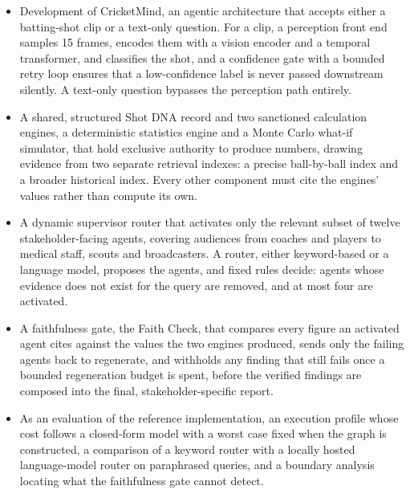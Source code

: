 \begin{itemize}
    \item Development of CricketMind, an agentic architecture that accepts either a batting-shot clip or a text-only question. For a clip, a perception front end samples 15 frames, encodes them with a vision encoder and a temporal transformer, and classifies the shot, and a confidence gate with a bounded retry loop ensures that a low-confidence label is never passed downstream silently. A text-only question bypasses the perception path entirely.
    \item A shared, structured Shot DNA record and two sanctioned calculation engines, a deterministic statistics engine and a Monte Carlo what-if simulator, that hold exclusive authority to produce numbers, drawing evidence from two separate retrieval indexes: a precise ball-by-ball index and a broader historical index. Every other component must cite the engines' values rather than compute its own.
    \item A dynamic supervisor router that activates only the relevant subset of twelve stakeholder-facing agents, covering audiences from coaches and players to medical staff, scouts and broadcasters. A router, either keyword-based or a language model, proposes the agents, and fixed rules decide: agents whose evidence does not exist for the query are removed, and at most four are activated.
    \item A faithfulness gate, the Faith Check, that compares every figure an activated agent cites against the values the two engines produced, sends only the failing agents back to regenerate, and withholds any finding that still fails once a bounded regeneration budget is spent, before the verified findings are composed into the final, stakeholder-specific report.
    \item As an evaluation of the reference implementation, an execution profile whose cost follows a closed-form model with a worst case fixed when the graph is constructed, a comparison of a keyword router with a locally hosted language-model router on paraphrased queries, and a boundary analysis locating what the faithfulness gate cannot detect.
\end{itemize}
